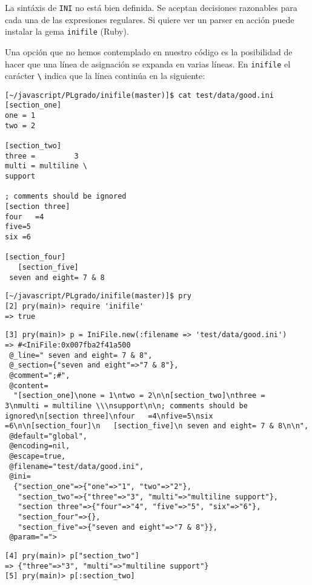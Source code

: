 \label{parrafo:inifile}
La sintáxis de \verb|INI| no está bien definida.
Se aceptan decisiones razonables para cada una de las expresiones regulares.
Si quiere ver un parser en acción puede
instalar la gema \verb|inifile| (Ruby). 


Una opción que no hemos contemplado en nuestro código es la posibilidad de hacer que una línea de asignación se expanda en varias líneas.
En \verb|inifile| el carácter \verb|\| indica 
que la línea continúa en la siguiente:
\begin{verbatim}
[~/javascript/PLgrado/inifile(master)]$ cat test/data/good.ini 
[section_one]
one = 1
two = 2

[section_two]
three =         3
multi = multiline \
support

; comments should be ignored
[section three]
four   =4
five=5
six =6

[section_four]
   [section_five]
 seven and eight= 7 & 8
\end{verbatim}

\begin{verbatim}
[~/javascript/PLgrado/inifile(master)]$ pry
[2] pry(main)> require 'inifile'
=> true
\end{verbatim}
\begin{verbatim}
[3] pry(main)> p = IniFile.new(:filename => 'test/data/good.ini')
=> #<IniFile:0x007fba2f41a500
 @_line=" seven and eight= 7 & 8",
 @_section={"seven and eight"=>"7 & 8"},
 @comment=";#",
 @content=
  "[section_one]\none = 1\ntwo = 2\n\n[section_two]\nthree =         3\nmulti = multiline \\\nsupport\n\n; comments should be ignored\n[section three]\nfour   =4\nfive=5\nsix =6\n\n[section_four]\n   [section_five]\n seven and eight= 7 & 8\n\n",
 @default="global",
 @encoding=nil,
 @escape=true,
 @filename="test/data/good.ini",
 @ini=
  {"section_one"=>{"one"=>"1", "two"=>"2"},
   "section_two"=>{"three"=>"3", "multi"=>"multiline support"},
   "section three"=>{"four"=>"4", "five"=>"5", "six"=>"6"},
   "section_four"=>{},
   "section_five"=>{"seven and eight"=>"7 & 8"}},
 @param="=">
\end{verbatim}

\begin{verbatim}
[4] pry(main)> p["section_two"]
=> {"three"=>"3", "multi"=>"multiline support"}
[5] pry(main)> p[:section_two]
\end{verbatim}


